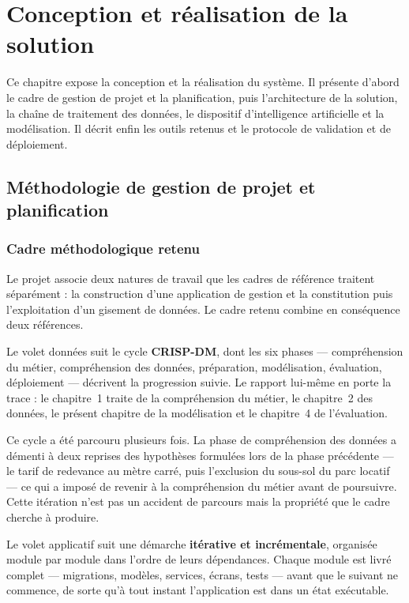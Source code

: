 \chapter{Conception et réalisation de la solution}
\label{chap:trois}

Ce chapitre expose la conception et la réalisation du système. Il présente d'abord le cadre de gestion de projet et la planification, puis l'architecture de la solution, la chaîne de traitement des données, le dispositif d'intelligence artificielle et la modélisation. Il décrit enfin les outils retenus et le protocole de validation et de déploiement.

\section{Méthodologie de gestion de projet et planification}
\label{sec:3-1}

\subsection{Cadre méthodologique retenu}

Le projet associe deux natures de travail que les cadres de référence traitent séparément : la construction d'une application de gestion et la constitution puis l'exploitation d'un gisement de données. Le cadre retenu combine en conséquence deux références.

Le volet données suit le cycle \textbf{CRISP-DM}, dont les six phases --- compréhension du métier, compréhension des données, préparation, modélisation, évaluation, déploiement --- décrivent la progression suivie. Le rapport lui-même en porte la trace : le chapitre~1 traite de la compréhension du métier, le chapitre~2 des données, le présent chapitre de la modélisation et le chapitre~4 de l'évaluation.

Ce cycle a été parcouru plusieurs fois. La phase de compréhension des données a démenti à deux reprises des hypothèses formulées lors de la phase précédente --- le tarif de redevance au mètre carré, puis l'exclusion du sous-sol du parc locatif --- ce qui a imposé de revenir à la compréhension du métier avant de poursuivre. Cette itération n'est pas un accident de parcours mais la propriété que le cadre cherche à produire.

Le volet applicatif suit une démarche \textbf{itérative et incrémentale}, organisée module par module dans l'ordre de leurs dépendances. Chaque module est livré complet --- migrations, modèles, services, écrans, tests --- avant que le suivant ne commence, de sorte qu'à tout instant l'application est dans un état exécutable.

